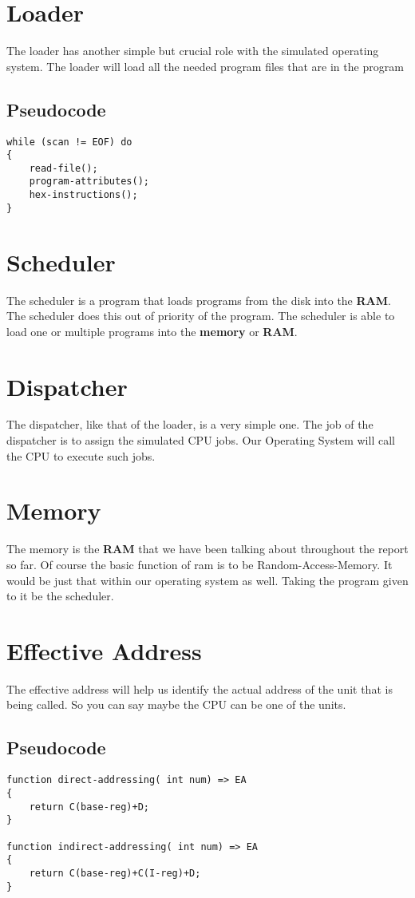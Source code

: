 \documentclass{report}
\begin{document}
\section{Loader}
The loader has another simple but crucial role with the simulated operating system.
The loader will load all the needed program files that are in the program

\subsection{Pseudocode}
\begin{lstlisting}
while (scan != EOF) do
{
	read-file();
	program-attributes();
	hex-instructions();
}
\end{lstlisting}

\section{Scheduler}
The scheduler is a program that loads programs from the disk into the \textbf{RAM}.
The scheduler does this out of priority of the program.
The scheduler is able to load one or multiple programs into the \textbf{memory} or \textbf{RAM}.
\section{Dispatcher}
The dispatcher, like that of the loader, is a very simple one.
The job of the dispatcher is to assign the simulated CPU jobs.
Our Operating System will call the CPU to execute such jobs.
\section{Memory}
The memory is the \textbf{RAM} that we have been talking about throughout the report so far.
Of course the basic function of ram is to be Random-Access-Memory.
It would be just that within our operating system as well.
Taking the program given to it be the scheduler.

\section{Effective Address}
The effective address will help us identify the actual address of the unit that is being called.
So you can say maybe the CPU can be one of the units.

\subsection{Pseudocode}
\begin{lstlisting}
function direct-addressing( int num) => EA
{
	return C(base-reg)+D;
}

function indirect-addressing( int num) => EA
{
	return C(base-reg)+C(I-reg)+D;
}
\end{lstlisting}
\end{document}
